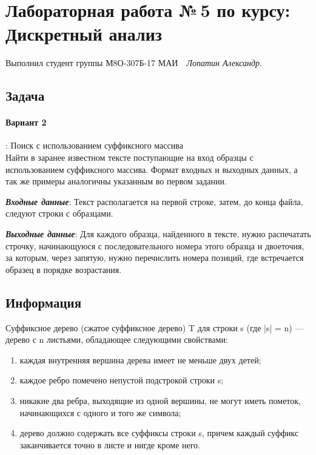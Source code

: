 \documentclass[12pt]{article}
\begin{document}
\section*{\centering Лабораторная работа №\,5 по курсу:\\ Дискретный анализ}

Выполнил студент группы М8О-307Б-17 МАИ \,\, \textit{Лопатин Александр}.

\subsection*{Задача}

\paragraph*{Вариант 2}: Поиск с использованием суффиксного
массива\\
Найти в заранее известном тексте поступающие на вход образцы с
использованием суффиксного массива. Формат входных и выходных
данных, а так же примеры аналогичны указанным во первом задании.

\textit{ \textbf{Входные данные}}: 
Текст располагается на первой строке, затем, до конца
файла, следуют строки с образцами.


\textit{ \textbf{Выходные данные}}: 
Для каждого образца, найденного в тексте, нужно
распечатать строчку, начинающуюся с последовательного номера этого
образца и двоеточия, за которым, через запятую, нужно перечислить
номера позиций, где встречается образец в порядке возрастания.

\subsection*{Информация}

Суффиксное дерево (сжатое суффиксное дерево) T для строки s (где |s| = n) — дерево с n листьями, обладающее следующими свойствами:
\begin{enumerate}
	\item каждая внутренняя вершина дерева имеет не меньше двух детей;
	\item каждое ребро помечено непустой подстрокой строки s;
	\item никакие два ребра, выходящие из одной вершины, не могут иметь пометок, начинающихся с одного и того же символа;
	\item дерево должно содержать все суффиксы строки s, причем каждый суффикс заканчивается точно в листе и нигде кроме него.
\end{enumerate}
\end{document}

